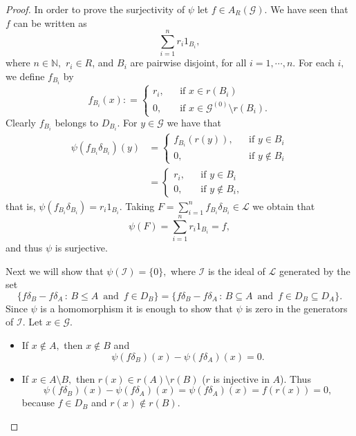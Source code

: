 \documentclass[11pt, a4paper]{amsart}
\newcommand{\N}{\ensuremath {\mathbb{N}} }
\newcommand{\G}{\ensuremath {\mathcal{G}}}
\newcommand{\Go}{\ensuremath {\mathcal{G}^{(0)}}}
\theoremstyle{plain}
\begin{document}
\begin{proof}
In order to prove the surjectivity of $\psi$ let $f \in A_R(\G).$ We have seen that $f$ can be written as 
  $$ \sum_{i=1}^n r_i 1_{B_i},$$
where $n \in \N,$ $r_i \in R$, and $B_i$ are pairwise disjoint, for all $i=1, \cdots, n$. For each $i,$  we define  $f_{B_i}$ by
$$
f_{B_i}(x): = \left\lbrace \begin{array}{lcl}
                  r_i, & & \mbox{if} \,\, x \in r(B_i) \\
                    0, & & \mbox{if} \,\, x \in \Go \setminus r(B_i).
                \end{array}\right. 
$$
Clearly  $f_{B_i}$  belongs to $D_{B_i}.$ For $y \in \G$ we have that
\begin{align*}
\psi(f_{B_i}\delta_{B_i})(y) & = \left\lbrace \begin{array}{lcl}
                                 f_{B_i}(r(y)), & & \mbox{if} \,\, y \in B_i \\
                                             0, & & \mbox{if} \,\, y \notin B_i
                                 \end{array}\right. \\
                             & = \left\lbrace \begin{array}{lcl}
                                 r_i, & & \mbox{if} \,\, y \in B_i \\
                                 0, & & \mbox{if} \,\, y \notin B_i,
                                 \end{array}\right.
\end{align*}
that is,  $\psi(f_{B_i}\delta_{B_i})= r_i1_{B_i}.$ Taking $F= \sum_{i=1}^n f_{B_i}\delta_{B_i} \in \mathcal{L}$ we obtain that
  $$ \psi(F)= \sum_{i=1}^n r_i 1_{B_i} = f,$$ 
and thus $\psi$ is surjective.

Next we will show that $\psi(\mathcal{I})=\{0\},$  where $\mathcal{I}$ is the ideal of $\mathcal{L}$  generated by the set
 {\small $$\{f\delta_B-f\delta_A \, : \, B \leq A \,\,\, \mbox{and} \,\,\, f \in D_B \}=  \{f\delta_B-f\delta_A \, : \, B \subseteq A \,\,\, \mbox{and} \,\,\, f \in D_B  \subseteq D_A\}.$$}
Since $\psi$ is a homomorphism it is enough to show that $\psi$  is zero in the generators of $\mathcal{I}.$ Let $x \in \G.$ 

\begin{itemize}
\item If $x \notin A,$ then $x \notin B$ and $$ \psi(f\delta_B)(x)-\psi(f\delta_A)(x)=0. $$

\item If $x \in A \setminus B,$ then $r(x) \in r(A)\setminus r(B)$ ($r$ is injective in $A$).  Thus $$ \psi(f\delta_B)(x)-\psi(f\delta_A)(x)= \psi(f \delta_A)(x)=f(r(x))=0,$$ because $f \in D_B $ and $r(x) \notin r(B).$


\end{itemize}
\end{proof}
\end{document}
